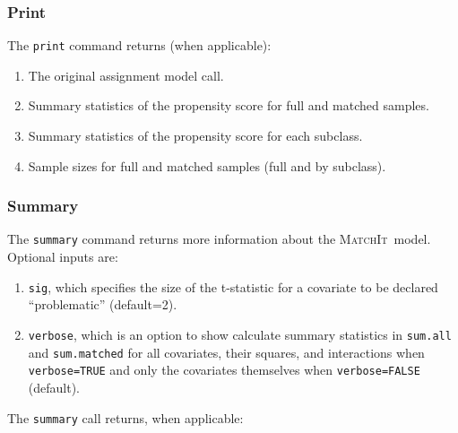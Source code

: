 \documentclass[oneside,letterpaper,titlepage]{article}
\newcommand{\MatchIt}{\textsc{MatchIt}}
\begin{document}
\subsubsection{Print}

The \texttt{print} command returns (when applicable):
\begin{enumerate}
\item The original assignment model call.
\item Summary statistics of the propensity score for full and matched
  samples.
\item Summary statistics of the propensity score for each subclass.
\item Sample sizes for full and matched samples (full and by subclass).
\end{enumerate}

\subsubsection{Summary}
\label{cmd:sum}
The \texttt{summary} command returns more information about the
\MatchIt\ model.  Optional inputs are:

\begin{enumerate}
\item \texttt{sig}, which specifies the size of the t-statistic for a
  covariate to be declared ``problematic'' (default=2).
  
\item \texttt{verbose}, which is an option to show calculate summary
  statistics in \texttt{sum.all} and \texttt{sum.matched} for all
  covariates, their squares, and interactions when
  \texttt{verbose=TRUE} and only the covariates themselves when
  \texttt{verbose=FALSE} (default).
\end{enumerate}

The \texttt{summary} call returns, when applicable:
\end{document}

